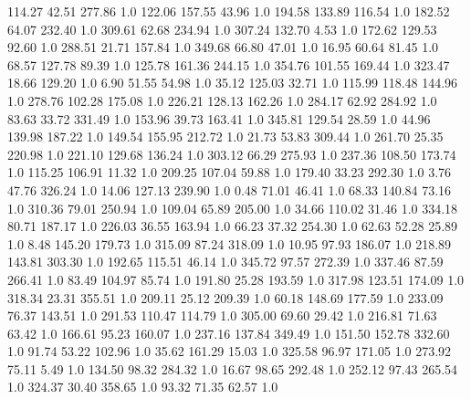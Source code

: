     114.27     42.51    277.86  1.0
    122.06    157.55     43.96  1.0
    194.58    133.89    116.54  1.0
    182.52     64.07    232.40  1.0
    309.61     62.68    234.94  1.0
    307.24    132.70      4.53  1.0
    172.62    129.53     92.60  1.0
    288.51     21.71    157.84  1.0
    349.68     66.80     47.01  1.0
     16.95     60.64     81.45  1.0
     68.57    127.78     89.39  1.0
    125.78    161.36    244.15  1.0
    354.76    101.55    169.44  1.0
    323.47     18.66    129.20  1.0
      6.90     51.55     54.98  1.0
     35.12    125.03     32.71  1.0
    115.99    118.48    144.96  1.0
    278.76    102.28    175.08  1.0
    226.21    128.13    162.26  1.0
    284.17     62.92    284.92  1.0
     83.63     33.72    331.49  1.0
    153.96     39.73    163.41  1.0
    345.81    129.54     28.59  1.0
     44.96    139.98    187.22  1.0
    149.54    155.95    212.72  1.0
     21.73     53.83    309.44  1.0
    261.70     25.35    220.98  1.0
    221.10    129.68    136.24  1.0
    303.12     66.29    275.93  1.0
    237.36    108.50    173.74  1.0
    115.25    106.91     11.32  1.0
    209.25    107.04     59.88  1.0
    179.40     33.23    292.30  1.0
      3.76     47.76    326.24  1.0
     14.06    127.13    239.90  1.0
      0.48     71.01     46.41  1.0
     68.33    140.84     73.16  1.0
    310.36     79.01    250.94  1.0
    109.04     65.89    205.00  1.0
     34.66    110.02     31.46  1.0
    334.18     80.71    187.17  1.0
    226.03     36.55    163.94  1.0
     66.23     37.32    254.30  1.0
     62.63     52.28     25.89  1.0
      8.48    145.20    179.73  1.0
    315.09     87.24    318.09  1.0
     10.95     97.93    186.07  1.0
    218.89    143.81    303.30  1.0
    192.65    115.51     46.14  1.0
    345.72     97.57    272.39  1.0
    337.46     87.59    266.41  1.0
     83.49    104.97     85.74  1.0
    191.80     25.28    193.59  1.0
    317.98    123.51    174.09  1.0
    318.34     23.31    355.51  1.0
    209.11     25.12    209.39  1.0
     60.18    148.69    177.59  1.0
    233.09     76.37    143.51  1.0
    291.53    110.47    114.79  1.0
    305.00     69.60     29.42  1.0
    216.81     71.63     63.42  1.0
    166.61     95.23    160.07  1.0
    237.16    137.84    349.49  1.0
    151.50    152.78    332.60  1.0
     91.74     53.22    102.96  1.0
     35.62    161.29     15.03  1.0
    325.58     96.97    171.05  1.0
    273.92     75.11      5.49  1.0
    134.50     98.32    284.32  1.0
     16.67     98.65    292.48  1.0
    252.12     97.43    265.54  1.0
    324.37     30.40    358.65  1.0
     93.32     71.35     62.57  1.0
